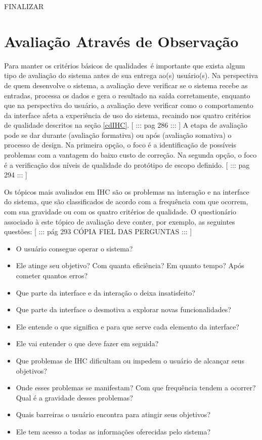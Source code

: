 \indent FINALIZAR

\section{Avaliação Através de Observação}

\indent Para manter os critérios básicos de qualidades\ é importante que exista algum tipo de avaliação do sistema antes de sua entrega ao(s) usuário(s). Na perspectiva de quem desenvolve o sistema, a avaliação deve verificar se o sistema recebe as entradas, processa os dados e gera o resultado na saída corretamente, enquanto que na perspectiva do usuário, a avaliação deve verificar como o comportamento da interface afeta a experiência de uso do sistema, recaindo nos quatro critérios de qualidade descritos na seção \ref{cdIHC}. [ ::: pag 286 ::: ] A etapa de avaliação pode se dar durante (avaliação formativa) ou após (avaliação somativa) o processo de design. Na primeira opção, o foco é a identificação de possíveis problemas com a vantagem do baixo custo de correção. Na segunda opção, o foco é a verificação dos níveis de qualidade do protótipo de escopo definido. [ ::: pag 294 ::: ]

\indent Os tópicos mais avaliados em IHC são os problemas na interação e na interface do sistema, que são classificados de acordo com a frequência com que ocorrem, com sua gravidade ou com os quatro critérios de qualidade. O questionário associado à este tópico de avaliação deve conter, por exemplo, as seguintes questões: [ ::: pág 293 CÓPIA FIEL DAS PERGUNTAS ::: ]
\begin{itemize}
\item O usuário consegue operar o sistema?
\item Ele atinge seu objetivo? Com quanta eficiência? Em quanto tempo? Após cometer quantos erros?
\item Que parte da interface e da interação o deixa insatisfeito?
\item Que parte da interface o desmotiva a explorar novas funcionalidades?
\item Ele entende o que significa e para que serve cada elemento da interface?
\item Ele vai entender o que deve fazer em seguida?
\item Que problemas de IHC dificultam ou impedem o usuário de alcançar seus objetivos?
\item Onde esses problemas se manifestam? Com que frequência tendem a ocorrer? Qual é a gravidade desses problemas?
\item Quais barreiras o usuário encontra para atingir seus objetivos?
\item Ele tem acesso a todas as informações oferecidas pelo sistema?
\end{itemize}

